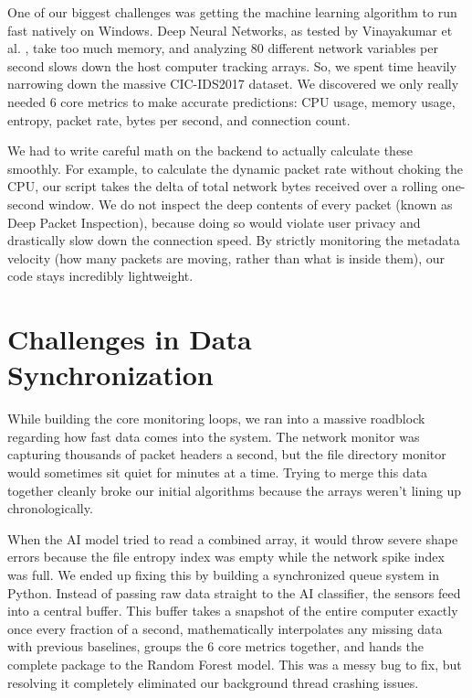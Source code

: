 \documentclass[conference]{IEEEtran}
\begin{document}
One of our biggest challenges was getting the machine learning algorithm to run fast natively on Windows. Deep Neural Networks, as tested by Vinayakumar et al. \cite{vinayakumar2021deep}, take too much memory, and analyzing 80 different network variables per second slows down the host computer tracking arrays. So, we spent time heavily narrowing down the massive CIC-IDS2017 dataset. We discovered we only really needed 6 core metrics to make accurate predictions: CPU usage, memory usage, entropy, packet rate, bytes per second, and connection count. 

We had to write careful math on the backend to actually calculate these smoothly. For example, to calculate the dynamic packet rate without choking the CPU, our script takes the delta of total network bytes received over a rolling one-second window. We do not inspect the deep contents of every packet (known as Deep Packet Inspection), because doing so would violate user privacy and drastically slow down the connection speed. By strictly monitoring the metadata velocity (how many packets are moving, rather than what is inside them), our code stays incredibly lightweight.

\section{Challenges in Data Synchronization}

While building the core monitoring loops, we ran into a massive roadblock regarding how fast data comes into the system. The network monitor was capturing thousands of packet headers a second, but the file directory monitor would sometimes sit quiet for minutes at a time. Trying to merge this data together cleanly broke our initial algorithms because the arrays weren't lining up chronologically. 

When the AI model tried to read a combined array, it would throw severe shape errors because the file entropy index was empty while the network spike index was full. We ended up fixing this by building a synchronized queue system in Python. Instead of passing raw data straight to the AI classifier, the sensors feed into a central buffer. This buffer takes a snapshot of the entire computer exactly once every fraction of a second, mathematically interpolates any missing data with previous baselines, groups the 6 core metrics together, and hands the complete package to the Random Forest model. This was a messy bug to fix, but resolving it completely eliminated our background thread crashing issues.
\end{document}
